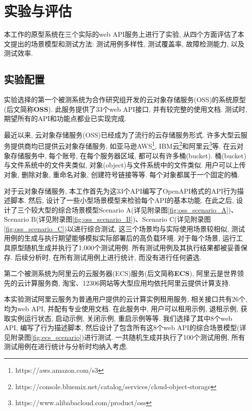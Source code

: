 \chapter{实验与评估}
    \label{sec:experiment}

    本工作的原型系统在三个实际的web API服务上进行了实验, 从四个方面评估了本文提出的场景模型和测试方法: 测试用例多样性, 测试覆盖率, 故障检测能力, 以及测试效率.
    
    \section{实验配置}
        实验选择的第一个被测系统为合作研究组开发的云对象存储服务(OSS)的系统原型(后文简称\textbf{OSS}). 此服务提供了33个web API接口, 并有较完整的使用文档. 测试时, 期望所有的API和功能点都业已实现完成.
        
        最近以来, 云对象存储服务(OSS)已经成为了流行的云存储服务形式. 许多大型云服务提供商均已提供云对象存储服务, 如亚马逊AWS\footnote{https://aws.amazon.com/s3}, IBM云\footnote{ https://console.bluemix.net/catalog/services/cloud-object-storage}和阿里云\footnote{ https://www.alibabacloud.com/product/oss}等. 在云对象存储服务中, 每个账号, 在每个服务器区域, 都可以有许多桶(bucket). 桶(bucket)与文件系统中的文件夹类似, 对象(object)与文件系统中的文件类似. 用户可以上传对象, 删除对象, 重命名对象, 创建符号链接等等. 每个对象都属于一个固定的桶.
        
        对于云对象存储服务, 本工作首先为这33个API编写了OpenAPI格式的API行为描述脚本. 然后, 设计了一些小型场景模型来检验每个API的基本功能. 在此之后, 设计了三个较大型的综合场景模型Scenario A(详见附录图\ref{fig:oss_scenario_A})、Scenario B(详见附录图\ref{fig:oss_scenario_B})、Scenario C(详见附录图\ref{fig:oss_scenario_C})以进行综合测试, 这三个场景均与实际使用场景较相似, 测试用例的生成与执行期望能够模拟实际部署后的高负载环境. 对于每个场景, 运行工具原型随机生成并执行了1,000个测试用例. 所有测试用例及其执行结果都被妥善保存. 后续分析时, 在所有测试用例上进行统计, 而没有进行任何遴选.
        
        第二个被测系统为阿里云的云服务器(ECS)服务(后文简称\textbf{ECS}), 阿里云是世界领先的云计算服务商, 淘宝、12306网站等大型应用均依托阿里云提供计算支持. 
        
        本实验测试阿里云服务为普通用户提供的云计算实例租用服务, 相关接口共有26个, 均为web API, 并配有专业使用文档. 在此服务中, 用户可以租用示例, 退租示例, 获取实例运行状态, 启动示例, 关闭示例, 重启示例等等. 我们选择了其中8个web API, 编写了行为描述脚本, 然后设计了包含所有这8个web API的综合场景模型(详见附录图\ref{fig:ecs_scenario})进行测试. 一共随机生成并执行了100个测试用例, 所有测试用例在进行统计与分析时均纳入考虑.
        
